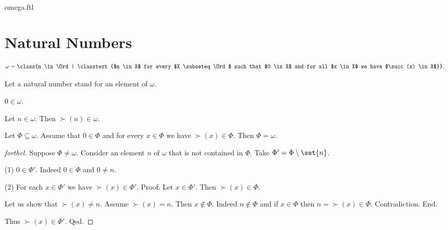\documentclass{naproche-library}
\begin{document}
\begin{smodule}{omega.ftl}

  \section*{Natural Numbers}

  \begin{definition}[forthel,id=SET_THEORY_03_4310076227584000]
    \[ \omega = \class{n \in \Ord | \classtext{$n \in X$ for every $X \subseteq \Ord$ such that $0 \in X$ and for all $x \in X$ we have $\succ(x) \in X$}}. \]

  Let a natural number stand for an element of $\omega$.
  \end{definition}

  \begin{proposition}[forthel,id=SET_THEORY_03_3576717620805632]
    $0 \in \omega$.
  \end{proposition}

  \begin{proposition}[forthel,id=SET_THEORY_03_8807317141192704]
    Let $n \in \omega$.
    Then $\succ(n) \in \omega$.
  \end{proposition}

  \begin{proposition}[forthel,id=SET_THEORY_03_344585425387520]
    Let $\Phi \subseteq \omega$.
    Assume that $0 \in \Phi$ and for every $x \in \Phi$ we have
    $\succ(x) \in \Phi$.
    Then $\Phi = \omega$.
  \end{proposition}
  \begin{proof}[forthel]
    Suppose $\Phi \neq \omega$.
    Consider an element $n$ of $\omega$ that is not contained in $\Phi$.
    Take $\Phi' = \Phi \setminus \set{n}$.

    (1) $0 \in \Phi'$.
    Indeed $0 \in \Phi$ and $0 \neq n$.

    (2) For each $x \in \Phi'$ we have $\succ(x) \in \Phi'$. \newline
    Proof.
      Let $x \in \Phi'$.
      Then $\succ(x) \in \Phi$.

      Let us show that $\succ(x) \neq n$.
        Assume $\succ(x) = n$.
        Then $x \notin \Phi$.
        Indeed $n \notin \Phi$ and if $x \in \Phi$ then
        $n = \succ(x) \in \Phi$.
        Contradiction.
      End.

      Thus $\succ(x) \in \Phi'$.
    Qed.


\end{proof}
\end{smodule}
\end{document}
